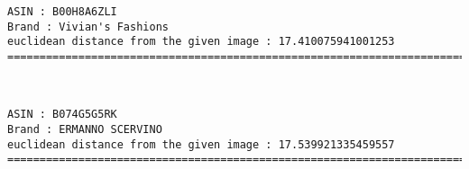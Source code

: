 \documentclass[11pt]{article}
\begin{document}
    \begin{Verbatim}[commandchars=\\\{\}]
ASIN : B00H8A6ZLI
Brand : Vivian's Fashions
euclidean distance from the given image : 17.410075941001253
=============================================================================================================================

    \end{Verbatim}

    \begin{center}
    \end{center}
    { \hspace*{\fill} \\}
    
    \begin{Verbatim}[commandchars=\\\{\}]
ASIN : B074G5G5RK
Brand : ERMANNO SCERVINO
euclidean distance from the given image : 17.539921335459557
=============================================================================================================================

    \end{Verbatim}
\end{document}

